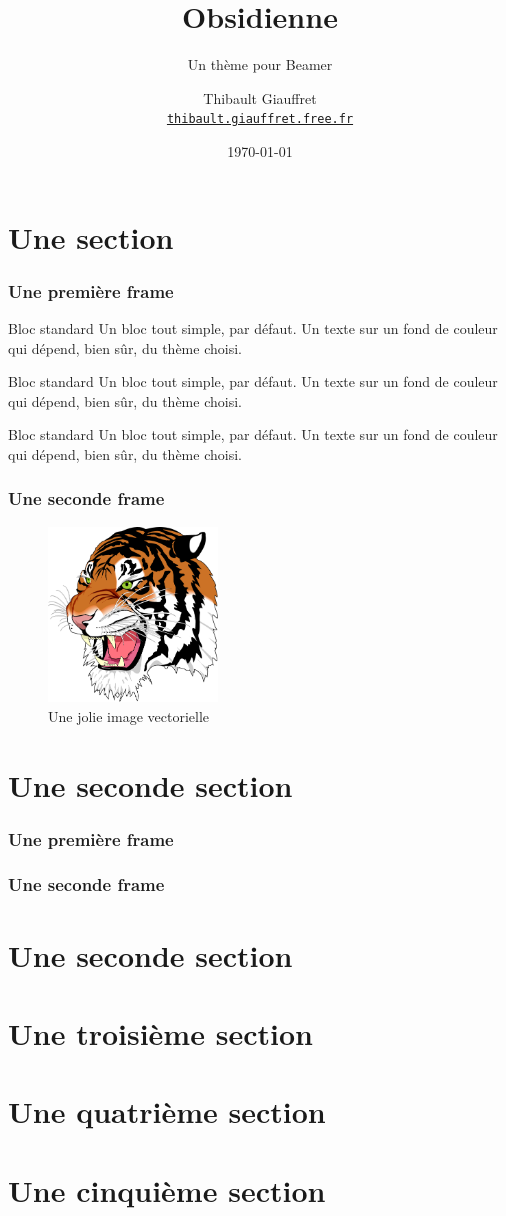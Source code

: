 \documentclass{beamer}
\title{Obsidienne} %
\subtitle{Un thème pour Beamer} %
\date[\today]{\today} %
\author[Th. G]{Thibault Giauffret\\ \href{http://thibault.giauffret.free.fr}{\texttt{thibault.giauffret.free.fr}}} %
\institute{ENS de Lyon} %
\begin{document}
	
\begin{frame}[plain]
	\titlepage
\end{frame}

\section{Une section}
\begin{frame}
	\frametitle{Une première frame}
	\begin{block}{Bloc standard}
		Un bloc tout simple, par défaut.
		Un texte sur un fond de couleur qui 
		dépend, bien sûr, du thème choisi. 
	\end{block}

	\begin{alertblock}{Bloc standard}
		Un bloc tout simple, par défaut.
		Un texte sur un fond de couleur qui 
		dépend, bien sûr, du thème choisi. 
	\end{alertblock}

	\begin{exampleblock}{Bloc standard}
		Un bloc tout simple, par défaut.
		Un texte sur un fond de couleur qui 
		dépend, bien sûr, du thème choisi. 
	\end{exampleblock}
\end{frame}

\begin{frame}
\frametitle{Une seconde frame}
\begin{figure}[h!]
	\includegraphics[width=0.4\textwidth]{tiger}
	\caption{Une jolie image vectorielle}
\end{figure}
\end{frame}

\section{Une seconde section}
\begin{frame}
\frametitle{Une première frame}
\end{frame}

\begin{frame}
\frametitle{Une seconde frame}
\end{frame}

\section{Une seconde section}
\section{Une troisième section}
\section{Une quatrième section}
\section{Une cinquième section}
\end{document}
